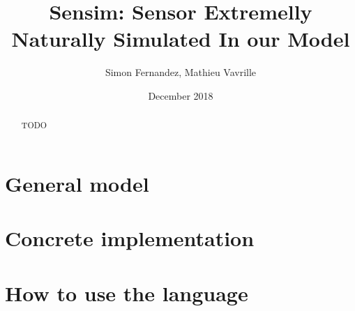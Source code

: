 \documentclass[a4paper,11pt]{article}
\title{Sensim: Sensor Extremelly Naturally Simulated In our Model}
\author{Simon Fernandez, Mathieu Vavrille}
\date{December 2018}
\begin{document}
\maketitle

\begin{abstract}
  TODO
\end{abstract}


\section{General model}






\section{Concrete implementation}






\section{How to use the language}



\end{document}
